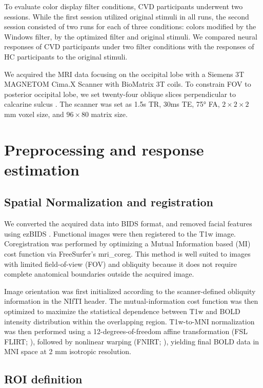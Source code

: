 To evaluate color display filter conditions, CVD participants underwent two sessions. While the first session utilized original stimuli in all runs, the second session consisted of two runs for each of three conditions: colors modified by the Windows filter, by the optimized filter and original stimuli. We compared neural responses of CVD participants under two filter conditions with the responses of HC participants to the original stimuli.

We acquired the MRI data focusing on the occipital lobe with a Siemens 3T MAGNETOM Cima.X Scanner with BioMatrix 3T coils. To constrain FOV to posterior occipital lobe, we set twenty-four oblique slices perpendicular to calcarine sulcus \cite{ryu2024}. The scanner was set as 1.5s TR, 30ms TE, 75° FA, $2 \times 2 \times 2$ mm voxel size, and $96 \times 80$ matrix size.

\section{Preprocessing and response estimation}

\subsection*{Spatial Normalization and registration}

We converted the acquired data into BIDS format, and removed facial features using ezBIDS \cite{levitas2024}. Functional images were then registered to the T1w image. Coregistration was performed by optimizing a Mutual Information based (MI) cost function \cite{maes1997, wells1996} via FreeSurfer's mri\_coreg. This method is well suited to images with limited field-of-view (FOV) and obliquity because it does not require complete anatomical boundaries outside the acquired image.

Image orientation was first initialized according to the scanner-defined obliquity information in the NIfTI header. The mutual-information cost function was then optimized to maximize the statistical dependence between T1w and BOLD intensity distribution within the overlapping region. T1w-to-MNI normalization was then performed using a 12-degrees-of-freedom affine transformation (FSL FLIRT; \cite{jenkinson2002}), followed by nonlinear warping (FNIRT; \cite{andersson2007}), yielding final BOLD data in MNI space at 2 mm isotropic resolution.

\subsection*{ROI definition}

